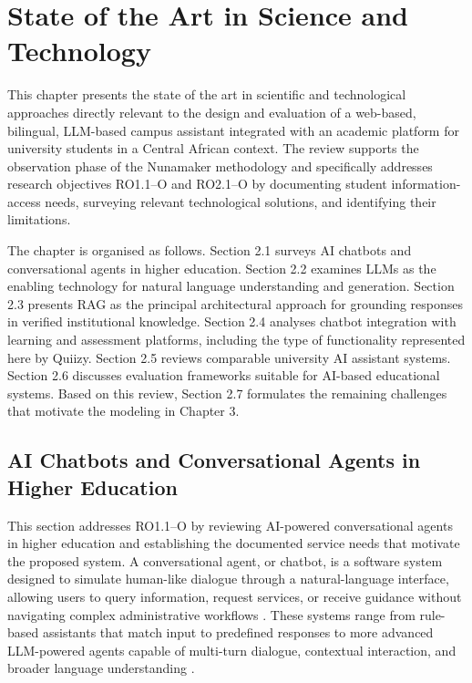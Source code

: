 \documentclass[a4paper,9pt,twocolumn]{extarticle}
\begin{document}
\section{State of the Art in Science and Technology}
\label{sec:soa}

This chapter presents the state of the art in scientific and
technological approaches directly relevant to the design and evaluation
of a web-based, bilingual, LLM-based campus assistant integrated with an
academic platform for university students in a Central African context.
The review supports the observation phase of the Nunamaker methodology
\cite{nunamaker1991} and specifically addresses research objectives
RO1.1--O and RO2.1--O by documenting student information-access needs,
surveying relevant technological solutions, and identifying their
limitations.

The chapter is organised as follows. Section 2.1 surveys AI chatbots and
conversational agents in higher education. Section 2.2 examines LLMs as
the enabling technology for natural language understanding and
generation. Section 2.3 presents RAG as the principal architectural
approach for grounding responses in verified institutional knowledge.
Section 2.4 analyses chatbot integration with learning and assessment
platforms, including the type of functionality represented here by
Quiizy. Section 2.5 reviews comparable university AI assistant systems.
Section 2.6 discusses evaluation frameworks suitable for AI-based
educational systems. Based on this review, Section 2.7 formulates the
remaining challenges that motivate the modeling in Chapter 3.

\subsection{AI Chatbots and Conversational Agents in Higher Education}
\label{sec:soa:chatbots}

This section addresses RO1.1--O by reviewing AI-powered conversational
agents in higher education and establishing the documented service needs
that motivate the proposed system. A conversational agent, or chatbot,
is a software system designed to simulate human-like dialogue through a
natural-language interface, allowing users to query information, request
services, or receive guidance without navigating complex administrative
workflows \cite{labadze2023,pereira2023}. These systems range from
rule-based assistants that match input to predefined responses to more
advanced LLM-powered agents capable of multi-turn dialogue, contextual
interaction, and broader language understanding \cite{wang2024,
stoehr2024}.
\end{document}
